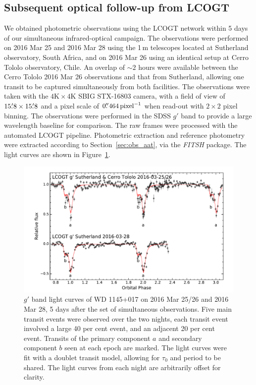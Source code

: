 \documentclass[useAMS,usenatbib]{mn2e}
\begin{document}
\subsection{Subsequent optical follow-up from LCOGT}
\label{sec:lcogt}

We obtained photometric observations using the LCOGT network \citep{2013PASP..125.1031B} within 5 days of our simultaneous infrared-optical campaign. The observations were performed on 2016 Mar 25 and 2016 Mar 28 using the 1\,m telescopes located at Sutherland observatory, South Africa, and on 2016 Mar 26 using an identical setup at Cerro Tololo observatory, Chile. An overlap of $\sim 2$ hours were available between the Cerro Tololo 2016 Mar 26 observations and that from Sutherland, allowing one transit to be captured simultaneously from both facilities. The observations were taken with the $4\mathrm{K} \times 4 \mathrm{K}$ SBIG STX-16803 camera, with a field of view of $15\hbox{$.\mkern-4mu^\prime$}8\times 15\hbox{$.\mkern-4mu^\prime$}8$ and a pixel scale of $0\hbox{$.\!\!^{\prime\prime}$}464\,\mathrm{pixel}^{-1}$ when read-out with $2\times 2$ pixel binning. The observations were performed in the SDSS $g'$ band to provide a large wavelength baseline for comparison. The raw frames were processed with the automated LCOGT pipeline. Photometric extraction and reference photometry were extracted according to Section~\ref{sec:obs_aat}, via the \emph{FITSH} package. The light curves are shown in Figure~\ref{fig:lcogt}.

\begin{figure}
    \centering
    \includegraphics[width=15cm]{plots/lcogt.pdf}
    \caption{$g'$ band light curves of WD 1145+017 on 2016 Mar 25/26 and 2016 Mar 28, 5 days after the set of simultaneous observations. Five main transit events were observed over the two nights, each transit event involved a large 40 per cent event, and an adjacent 20 per cent event. Transits of the primary component $a$ and secondary component $b$ seen at each epoch are marked. The light curves were fit with a doublet transit model, allowing for $\tau_0$ and period to be shared. The light curves from each night are arbitrarily offset for clarity.}
    \label{fig:lcogt}
\end{figure}
\end{document}
